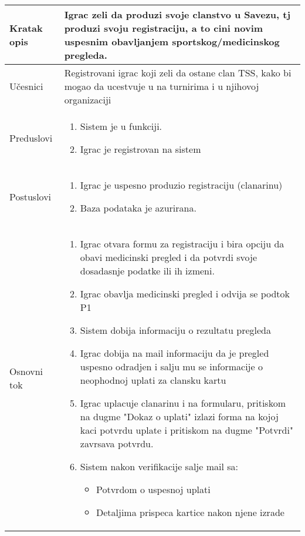 \documentclass{article}
\begin{document}

\begin{longtable}{| p{} | p{} |} 
\hline
    Kratak opis & Igrac zeli da produzi svoje clanstvo u Savezu, tj produzi svoju registraciju, a to cini novim uspesnim obavljanjem sportskog/medicinskog pregleda.\\ 
\hline    
    Učesnici & 
         Registrovani igrac koji zeli da ostane clan TSS, kako bi mogao da ucestvuje u na turnirima i u njihovoj organizaciji
    \\
\hline
   Preduslovi & \begin{enumerate}
       \item Sistem je u funkciji.
       \item Igrac je registrovan na sistem
   \end{enumerate}\\
\hline  
    Postuslovi & \begin{enumerate}
        \item Igrac je uspesno produzio registraciju (clanarinu)
        \item Baza podataka je azurirana.
    \end{enumerate}\\
\hline
    Osnovni tok & \begin{enumerate}
        \item Igrac otvara formu za registraciju i bira opciju da obavi medicinski pregled i da potvrdi svoje dosadasnje podatke ili ih izmeni.
        \item Igrac obavlja medicinski pregled i odvija se podtok P1
        \item Sistem dobija informaciju o rezultatu pregleda
        \item Igrac dobija na mail informaciju da je pregled uspesno odradjen i salju mu se informacije o neophodnoj uplati za clansku kartu
        \item Igrac uplacuje clanarinu i na formularu, pritiskom na dugme "Dokaz o uplati" izlazi forma na kojoj kaci potvrdu uplate i pritiskom na dugme "Potvrdi" zavrsava potvrdu.
        \item Sistem nakon verifikacije salje mail sa:
        \begin{itemize}
            \item Potvrdom o uspesnoj uplati
            \item Detaljima prispeca kartice nakon njene izrade

\end{itemize}
\end{enumerate}
\end{longtable}
\end{document}
